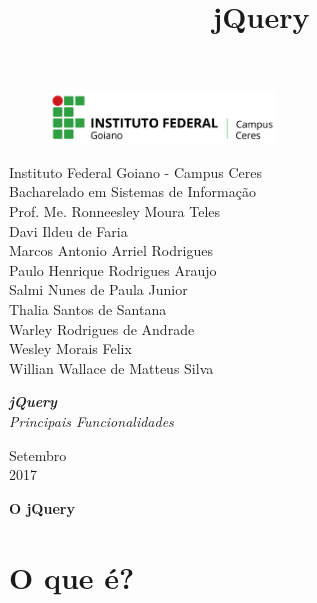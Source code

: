 \documentclass[12pt,a4paper]{article}
\title{jQuery}
\begin{document}
\begin{titlepage}


\begin{center}
\begin{figure}[htb]
		
		\label{figura:LogoIF}
	
		\centering
		\includegraphics[width=6cm]{logo.png} 
\end{figure}


Instituto Federal Goiano - Campus Ceres\\
Bacharelado em Sistemas de Informação\\
Prof. Me. Ronneesley Moura Teles\\\vspace{0.2cm}
Davi Ildeu de Faria \\
Marcos Antonio Arriel Rodrigues \\
Paulo Henrique Rodrigues Araujo \\
Salmi Nunes de Paula Junior \\
Thalia Santos de Santana\\
Warley Rodrigues de Andrade \\
Wesley Morais Felix \\
Willian Wallace de Matteus Silva\\\vspace{6.0cm}

\textit{\textbf{\Large{jQuery}}}\\\vspace{0.5cm}
\textit{\Large{Principais Funcionalidades}}\\\vspace{8.5cm}

Setembro\\
2017\\
\end{center}
\end{titlepage}



\tableofcontents

\newpage
\begin{center}
\textbf{\Large{O jQuery}}\\\vspace{0.5cm}
\end{center}
\section{O que é?}%
\end{document}
